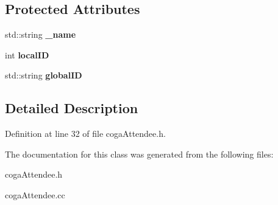 \subsection*{\-Protected \-Attributes}
\begin{DoxyCompactItemize}
\item 
\hypertarget{classcoga_attendee_a04ed9ade71e96aefe7b9b6d261b6d139}{
std\-::string {\bfseries \-\_\-name}}
\label{classcoga_attendee_a04ed9ade71e96aefe7b9b6d261b6d139}

\item 
\hypertarget{classcoga_attendee_a17e66f5268ca061547f2306f20e7709c}{
int {\bfseries local\-I\-D}}
\label{classcoga_attendee_a17e66f5268ca061547f2306f20e7709c}

\item 
\hypertarget{classcoga_attendee_aa3aa7163f1e63993a84130f18b0cdaea}{
std\-::string {\bfseries global\-I\-D}}
\label{classcoga_attendee_aa3aa7163f1e63993a84130f18b0cdaea}

\end{DoxyCompactItemize}


\subsection{\-Detailed \-Description}


\-Definition at line 32 of file coga\-Attendee.\-h.



\-The documentation for this class was generated from the following files\-:\begin{DoxyCompactItemize}
\item 
coga\-Attendee.\-h\item 
coga\-Attendee.\-cc\end{DoxyCompactItemize}
